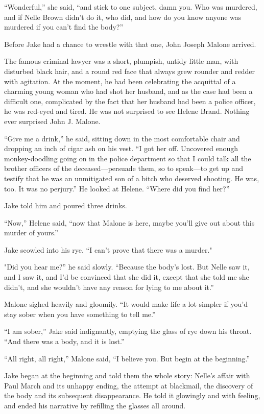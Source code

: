 \documentclass{novel}
\begin{document}
“Wonderful,” she said, “and stick to one subject, damn you. Who was murdered, and if Nelle Brown didn’t do it, who did, and how do you know anyone was murdered if you can’t find the body?”

Before Jake had a chance to wrestle with that one, John Joseph Malone arrived.

The famous criminal lawyer was a short, plumpish, untidy little man, with disturbed black hair, and a round red face that always grew rounder and redder with agitation. At the moment, he had been celebrating the acquittal of a charming young woman who had shot her husband, and as the case had been a difficult one, complicated by the fact that her husband had been a police officer, he was red-eyed and tired. He was not surprised to see Helene Brand. Nothing ever surprised John J. Malone.

“Give me a drink,” he said, sitting down in the most comfortable chair and dropping an inch of cigar ash on his vest. “I got her off. Uncovered enough monkey-doodling going on in the police department so that I could talk all the brother officers of the deceased—persuade them, so to speak—to get up and testify that he was an unmitigated son of a bitch who deserved shooting. He was, too. It was no perjury.” He looked at Helene. “Where did you find her?”

Jake told him and poured three drinks.

“Now,” Helene said, “now that Malone is here, maybe you’ll give out about this murder of yours.”

Jake scowled into his rye. “I can’t prove that there was a murder."

"Did you hear me?” he said slowly. “Because the body’s lost. But Nelle saw it, and I saw it, and I'd be convinced that she did it, except that she told me she didn’t, and she wouldn’t have any reason for lying to me about it.”

Malone sighed heavily and gloomily. “It would make life a lot simpler if you’d stay sober when you have something to tell me.”

“I am sober,” Jake said indignantly, emptying the glass of rye down his throat. “And there was a body, and it is lost.”

“All right, all right,” Malone said, “I believe you. But begin at the beginning.”

Jake began at the beginning and told them the whole story: Nelle’s affair with Paul March and its unhappy ending, the attempt at blackmail, the discovery of the body and its subsequent disappearance. He told it glowingly and with feeling, and ended his narrative by refilling the glasses all around.
\end{document}
